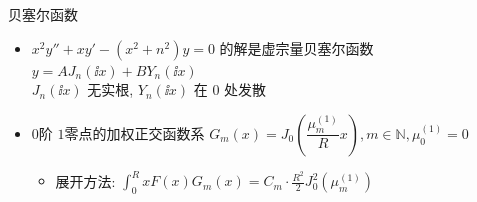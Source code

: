 \documentclass[landscape,a4paper]{ctexart}
\begin{document}
\begin{cheatsheetcolumns}[3]
\begin{card}{贝塞尔函数}
\begin{itemize}
\begin{itemize}
			\item $\int \frac{J_0(x)}{x^m}\,\odif{x}=\frac{J_1(x)}{(m-1)^2x^{m-2}}-\frac{J_0(x)}{(m-1)x^{m-1}}-\frac{1}{(m-1)^2}\int \frac{J_0(x)}{x^{m-2}}\,\odif{x}$
			\item $\int\frac{J_1(x)}{x^m}\,\odif{x}=-\frac{J_1(x)}{mx^{m-1}}+\frac{1}{m}\int \frac{J_0(x)}{x^{m-1}}\,\odif{x}$
			\end{itemize}
			\item $x^2y''+xy'-\left(x^2+n^2\right)y=0$ 的解是虚宗量贝塞尔函数 $y=AJ_n(\ii x)+BY_n(\ii x)$\\
			$J_n(\ii x)$ 无实根, $Y_n(\ii x)$ 在 $0$ 处发散
			\item $0$阶 $1$零点的加权正交函数系 $G_m(x)=J_0\left(\dfrac{\mu^{(1)}_m}{R}x\right), m\in\mathbb N, \mu^{(1)}_0=0$
			\begin{itemize}
				\item 展开方法: $\int_0^R xF(x)G_m(x)=C_m\cdot\frac{R^2}{2}J_0^2\left(\mu^{(1)}_m\right)$
			\end{itemize}
			\end{itemize}
		\end{card}
	\end{cheatsheetcolumns}
\end{document}

